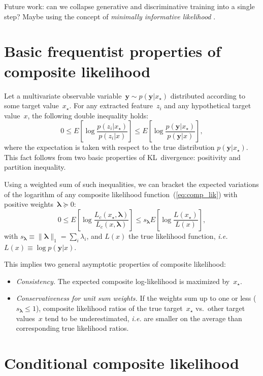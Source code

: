 \documentclass[english]{scrartcl}
\def\y{{\mathbf{y}}}
\newcommand{\blambda}{{\boldsymbol{\lambda}}}
\begin{document}
Future work: can we collapse generative and discriminative training into a single step? Maybe using the concept of {\em minimally informative likelihood} \cite{Yuan-99b}.


\appendix


\section{Basic frequentist properties of composite likelihood}
\label{appendix:frequentist}

Let a multivariate observable variable~$\y \sim p(\y|x_\star)$ distributed according to some target value~$x_\star$. For any extracted feature~$z_i$ and any hypothetical target value~$x$, the following double inequality holds:
$$
0 \leq
E\left[
\log \frac{p(z_i|x_\star)}{p(z_i|x)}
\right]
\leq
E\left[
\log \frac{p(\y|x_\star)}{p(\y|x)}
\right],
$$
where the expectation is taken with respect to the true distribution $p(\y|x_\star)$. This fact follows from two basic properties of KL~divergence: positivity and partition inequality.

Using a weighted sum of such inequalities, we can bracket the expected variations of the logarithm of any composite likelihood function~(\ref{eq:comp_lik}) with positive weights~$\blambda\succeq 0$:
\begin{equation}
\label{eq:variation_bound}
0 \leq
E\left[ \log \frac{L_c(x_\star, \blambda)}{L_c(x,\blambda)} \right]
\leq 
s_\blambda E\left[ \log \frac{L(x_\star)}{L(x)} \right]
,
\end{equation}
with $s_\blambda\equiv \|\blambda\|_1 =\sum_i \lambda_i$, and $L(x)$ the true likelihood function, {\em i.e.} $L(x)\equiv \log p(\y|x)$.

This implies two general asymptotic properties of composite likelihood:
\begin{itemize}
\item {\em Consistency.} The expected composite log-likelihood is maximized by~$x_\star$.
\item {\em Conservativeness for unit sum weights.} If the weights sum up to one or less ($s_\blambda\leq 1$), composite likelihood ratios of the true target~$x_\star$ vs.~other target values~$x$ tend to be underestimated, {\em i.e.} are smaller on the average than corresponding true likelihood ratios.
\end{itemize}


\section{Conditional composite likelihood}
\label{appendix:conditional}
\end{document}
